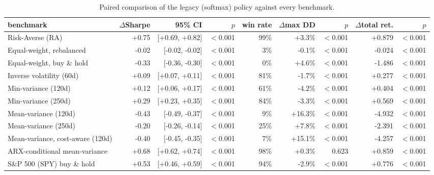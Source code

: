 \begin{table}[ht!]
\centering
\footnotesize
\setlength{\tabcolsep}{4pt}
\begin{tabular}{lrrrrrrrr}
\hline
benchmark & $\Delta$Sharpe & 95\% CI & $p$ & win rate & $\Delta$max DD & $p$ & $\Delta$total ret. & $p$ \\
\hline
Risk-Averse (RA) & +0.75 & [+0.69, +0.82] & $<$0.001 & 99\% & +3.3\% & $<$0.001 & +0.879 & $<$0.001 \\
Equal-weight, rebalanced & -0.02 & [-0.02, -0.02] & $<$0.001 & 3\% & -0.1\% & $<$0.001 & -0.024 & $<$0.001 \\
Equal-weight, buy \& hold & -0.33 & [-0.36, -0.30] & $<$0.001 & 0\% & +4.6\% & $<$0.001 & -1.486 & $<$0.001 \\
Inverse volatility (60d) & +0.09 & [+0.07, +0.11] & $<$0.001 & 81\% & -1.7\% & $<$0.001 & +0.277 & $<$0.001 \\
Min-variance (120d) & +0.12 & [+0.06, +0.17] & $<$0.001 & 61\% & -4.2\% & $<$0.001 & +0.404 & $<$0.001 \\
Min-variance (250d) & +0.29 & [+0.23, +0.35] & $<$0.001 & 84\% & -3.3\% & $<$0.001 & +0.569 & $<$0.001 \\
Mean-variance (120d) & -0.43 & [-0.49, -0.37] & $<$0.001 & 9\% & +16.3\% & $<$0.001 & -4.932 & $<$0.001 \\
Mean-variance (250d) & -0.20 & [-0.26, -0.14] & $<$0.001 & 25\% & +7.8\% & $<$0.001 & -2.391 & $<$0.001 \\
Mean-variance, cost-aware (120d) & -0.40 & [-0.45, -0.35] & $<$0.001 & 7\% & +15.1\% & $<$0.001 & -4.257 & $<$0.001 \\
ARX-conditional mean-variance & +0.68 & [+0.62, +0.74] & $<$0.001 & 98\% & +0.3\% & 0.623 & +0.859 & $<$0.001 \\
S\&P 500 (SPY) buy \& hold & +0.53 & [+0.46, +0.59] & $<$0.001 & 94\% & -2.9\% & $<$0.001 & +0.776 & $<$0.001 \\
\hline
\end{tabular}
\caption{Paired comparison of the legacy (softmax) policy against every benchmark.}
\label{tab:bench_paired_softmax_covid}
\end{table}
